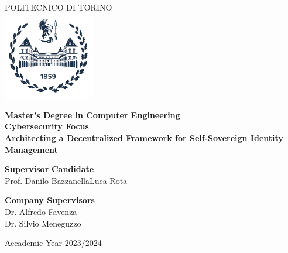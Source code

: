 \begin{titlepage}


  \begin{center}

    {\huge POLITECNICO DI TORINO}\\[1cm]

    \includegraphics[width=0.3\textwidth]{./Images/logo_polito_2021.jpg}

    \textbf{\large Master’s Degree in Computer Engineering\\Cybersecurity Focus}\\[3cm]


    \textbf{\huge Architecting a Decentralized Framework for Self-Sovereign Identity Management }\\[2cm]

    \vspace{3.5cm}

    \begin{minipage}{0.85\textwidth}

      \begin{flushleft}\large
        \textbf{Supervisor} \hfill \textbf{Candidate}\\
        Prof. Danilo Bazzanella\hfill Luca Rota\\
      \end{flushleft}

      \begin{flushleft}\large
        \textbf{Company Supervisors} \\
        Dr. Alfredo Favenza\\
        Dr. Silvio Meneguzzo\\
      \end{flushleft}

    \end{minipage}

    \vfill

    Accademic Year 2023/2024
  \end{center}

  \restoregeometry

\end{titlepage}
